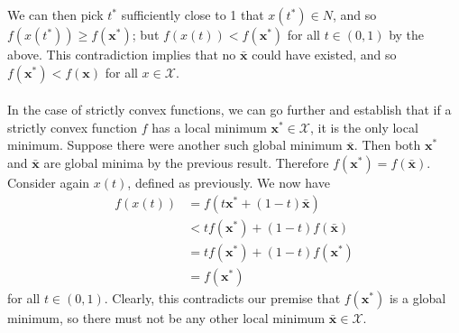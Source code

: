 \documentclass{article}
\begin{document}
We can then pick $t^*$ sufficiently close to 1 that $x(t^*) \in N$, and so $f(x(t^*)) \geq f(\mathbf{x}^*)$; but $f(x(t)) < f(\mathbf{x}^*)$ for all $t \in (0, 1)$ by the above. This contradiction implies that no $\bar{\mathbf{x}}$ could have existed, and so $f(\mathbf{x}^*) < f(\mathbf{x})$ for all $x \in \mathcal{X}$.\\\\
In the case of strictly convex functions, we can go further and establish that if a strictly convex function $f$ has a local minimum $\mathbf{x}^* \in \mathcal{X}$, it is the only local minimum. Suppose there were another such global minimum $\bar{\mathbf{x}}$. Then both $\mathbf{x}^*$ and $\bar{\mathbf{x}}$ are global minima by the previous result. Therefore $f(\mathbf{x}^*) = f(\bar{\mathbf{x}})$. Consider again $x(t)$, defined as previously. We now have
\begin{align*}
f(x(t)) &= f(t\mathbf{x}^* + (1-t)\bar{\mathbf{x}})\\
	&< tf(\mathbf{x}^*) + (1-t)f(\bar{\mathbf{x}})\\
	&= tf(\mathbf{x}^*) + (1-t)f(\mathbf{x}^*)\\
	&= f(\mathbf{x}^*)
\end{align*}
for all $t \in (0, 1)$. Clearly, this contradicts our premise that $f(\mathbf{x}^*)$ is a global minimum, so there must not be any other local minimum $\bar{\mathbf{x}} \in \mathcal{X}$.
\clearpage
\end{document}

